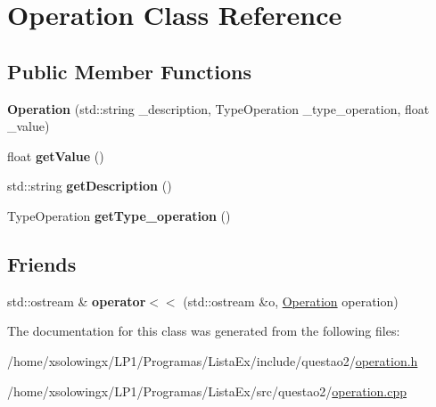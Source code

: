 \hypertarget{classOperation}{}\section{Operation Class Reference}
\label{classOperation}
\subsection*{Public Member Functions}
\begin{DoxyCompactItemize}
\item 
\mbox{\label{classOperation_a2b8a8d86b297a45c1a677cc3d7af9174}} 
{\bfseries Operation} (std\+::string \+\_\+description, Type\+Operation \+\_\+type\+\_\+operation, float \+\_\+value)
\item 
\mbox{\label{classOperation_a9b2a4bda36bca3b14c5b76e8f6a47d93}} 
float {\bfseries get\+Value} ()
\item 
\mbox{\label{classOperation_a6ab35e3b17952fcb981d7b8768b15f3d}} 
std\+::string {\bfseries get\+Description} ()
\item 
\mbox{\label{classOperation_a7fc75204f0374b316b16f410398dd62b}} 
Type\+Operation {\bfseries get\+Type\+\_\+operation} ()
\end{DoxyCompactItemize}
\subsection*{Friends}
\begin{DoxyCompactItemize}
\item 
\mbox{\label{classOperation_a2595e2d474930011c8adb05ccfd16ea4}} 
std\+::ostream \& {\bfseries operator$<$$<$} (std\+::ostream \&o, \hyperlink{classOperation}{Operation} operation)
\end{DoxyCompactItemize}


The documentation for this class was generated from the following files\+:\begin{DoxyCompactItemize}
\item 
/home/xsolowingx/\+L\+P1/\+Programas/\+Lista\+Ex/include/questao2/\hyperlink{operation_8h}{operation.\+h}\item 
/home/xsolowingx/\+L\+P1/\+Programas/\+Lista\+Ex/src/questao2/\hyperlink{operation_8cpp}{operation.\+cpp}\end{DoxyCompactItemize}
